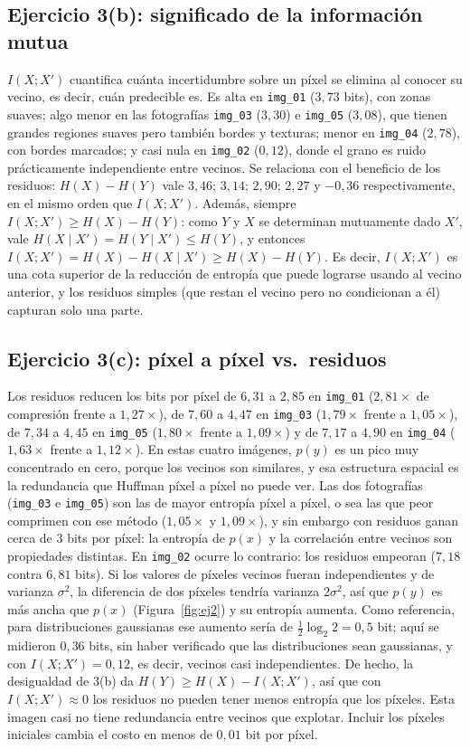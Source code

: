 \documentclass[11pt,a4paper]{article}
\begin{document}
\subsection{Ejercicio 3(b): significado de la información mutua}
$I(X;X')$ cuantifica cuánta incertidumbre sobre un píxel se elimina al conocer su vecino, es decir, cuán predecible es. Es alta en \texttt{img\_01} ($3{,}73$ bits), con zonas suaves; algo menor en las fotografías \texttt{img\_03} ($3{,}30$) e \texttt{img\_05} ($3{,}08$), que tienen grandes regiones suaves pero también bordes y texturas; menor en \texttt{img\_04} ($2{,}78$), con bordes marcados; y casi nula en \texttt{img\_02} ($0{,}12$), donde el grano es ruido prácticamente independiente entre vecinos. Se relaciona con el beneficio de los residuos: $H(X)-H(Y)$ vale $3{,}46$; $3{,}14$; $2{,}90$; $2{,}27$ y $-0{,}36$ respectivamente, en el mismo orden que $I(X;X')$. Además, siempre $I(X;X')\ge H(X)-H(Y)$: como $Y$ y $X$ se determinan mutuamente dado $X'$, vale $H(X\mid X')=H(Y\mid X')\le H(Y)$, y entonces $I(X;X')=H(X)-H(X\mid X')\ge H(X)-H(Y)$. Es decir, $I(X;X')$ es una cota superior de la reducción de entropía que puede lograrse usando al vecino anterior, y los residuos simples (que restan el vecino pero no condicionan a él) capturan solo una parte.

\subsection{Ejercicio 3(c): píxel a píxel vs.\ residuos}
Los residuos reducen los bits por píxel de $6{,}31$ a $2{,}85$ en \texttt{img\_01} ($2{,}81\times$ de compresión frente a $1{,}27\times$), de $7{,}60$ a $4{,}47$ en \texttt{img\_03} ($1{,}79\times$ frente a $1{,}05\times$), de $7{,}34$ a $4{,}45$ en \texttt{img\_05} ($1{,}80\times$ frente a $1{,}09\times$) y de $7{,}17$ a $4{,}90$ en \texttt{img\_04} ($1{,}63\times$ frente a $1{,}12\times$). En estas cuatro imágenes, $p(y)$ es un pico muy concentrado en cero, porque los vecinos son similares, y esa estructura espacial es la redundancia que Huffman píxel a píxel no puede ver. Las dos fotografías (\texttt{img\_03} e \texttt{img\_05}) son las de mayor entropía píxel a píxel, o sea las que peor comprimen con ese método ($1{,}05\times$ y $1{,}09\times$), y sin embargo con residuos ganan cerca de $3$ bits por píxel: la entropía de $p(x)$ y la correlación entre vecinos son propiedades distintas. En \texttt{img\_02} ocurre lo contrario: los residuos empeoran ($7{,}18$ contra $6{,}81$ bits). Si los valores de píxeles vecinos fueran independientes y de varianza $\sigma^2$, 
la diferencia de dos píxeles tendría varianza $2\sigma^2$, así que $p(y)$ es más ancha que $p(x)$ (Figura~\ref{fig:ej2}) y su entropía aumenta. Como referencia, para distribuciones gaussianas ese aumento sería de $\tfrac12\log_2 2=0{,}5$ bit; aquí se midieron $0{,}36$ bits, sin haber verificado que las distribuciones sean gaussianas, y con $I(X;X')=0{,}12$, es decir, vecinos casi independientes. De hecho, la desigualdad de 3(b) da $H(Y)\ge H(X)-I(X;X')$, así que con $I(X;X')\approx 0$ los residuos no pueden tener menos entropía que los píxeles.
Esta imagen casi no tiene redundancia entre vecinos que explotar. Incluir los píxeles iniciales cambia el costo en menos de $0{,}01$ bit por píxel.
\end{document}
